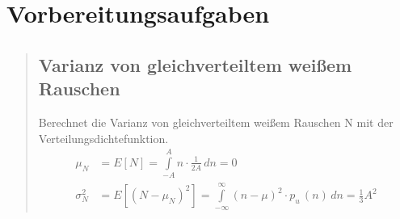 \section{Vorbereitungsaufgaben}
\begin{quote}
    \hspace{-2em}
    \subsection{Varianz von gleichverteiltem weißem Rauschen}
    Berechnet die Varianz von gleichverteiltem weißem Rauschen N mit der Verteilungsdichtefunktion.\\
    
     \begin{equation*}
    	\begin{split}
    	    \mu_{N}&=E[N]=\int\limits_{-A}^{A} n \cdot \frac{1}{2A} \,dn=0 \\
    		\sigma_{N}^2&=E[(N-\mu_{N})^2]=\int\limits_{-\infty}^{\infty} (n-\mu)^2
    		\cdot p_{u}\,(n) \,dn=\frac{1}{3}A^2
    	\end{split}
     \end{equation*}
    
    
    \begin{quote}
    
    \end{quote}
      
\end{quote}



